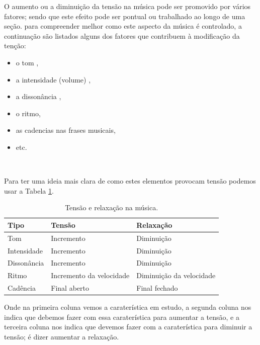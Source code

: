 O aumento ou a diminuição da tensão na música pode ser promovido por vários fatores; 
sendo que este efeito pode ser pontual ou trabalhado ao longo de uma seção.
para compreender melhor como este aspecto da música  é controlado,
 a continuação são listados alguns dos fatores que contribuem à modificação da tenção:
\begin{itemize}
\item o tom \cite[pp. 3]{wright2012essential},
\item a intensidade (volume) \cite[pp. 3]{wright2012essential},
\item a dissonância \cite[pp. 28-29]{kerman2015listen} \cite[pp. 26]{wright2012essential},
\item o ritmo, 
\item as cadencias nas frases musicais,
\item etc.
\end{itemize}~

Para ter uma ideia mais clara de como estes elementos provocam tensão podemos usar a Tabela  \ref{tab:tensionrelease1}.  
\begin{table}[h]
  \centering
  \begin{tabular}{| p{3cm} || p{3.0cm} | p{3.0cm} |}
   \hline 
   Tipo & Tensão     & Relaxação \\ \hline 
   \hline 
   Tom          & Incremento & Diminuição  \\ \hline
   Intensidade  & Incremento & Diminuição  \\ \hline
   Dissonância  & Incremento & Diminuição  \\ \hline
   Ritmo        & Incremento da velocidade & Diminuição da velocidade \\ \hline
   Cadência     & Final aberto & Final fechado \\ \hline
  \end{tabular}
  \caption{Tensão e relaxação na música.}
  \label{tab:tensionrelease1}
\end{table}
Onde na primeira coluna  vemos a caraterística em estudo,
a segunda coluna nos indica que debemos fazer com essa caraterística para aumentar a tensão,
e a terceira coluna nos indica que devemos fazer com a caraterística para diminuir a tensão;
é dizer aumentar a relaxação.


